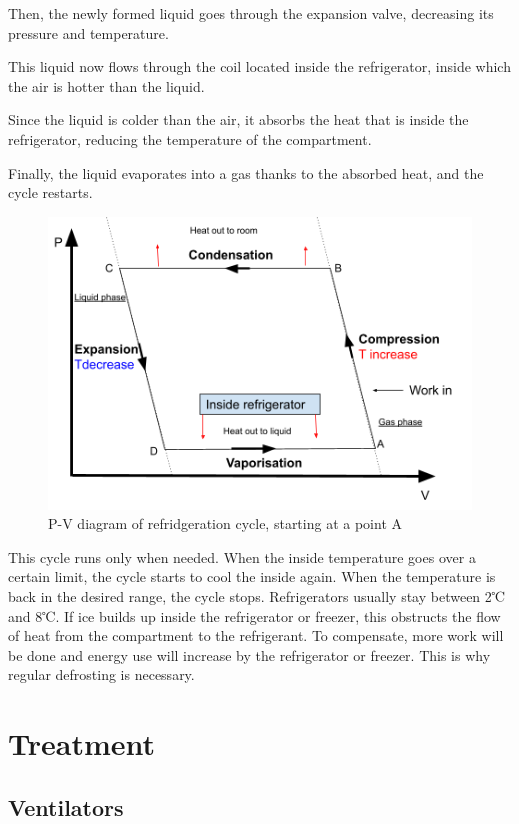 \documentclass[11pt]{report}
\begin{document}
Then, the newly formed liquid goes through the expansion valve, decreasing its pressure and temperature.

This liquid now flows through the coil located inside the refrigerator, inside which the air is hotter than the liquid.

Since the liquid is colder than the air, it absorbs the heat that is inside the refrigerator, reducing the temperature of the compartment. 

Finally, the liquid evaporates into a gas thanks to the absorbed heat, and the cycle restarts.

\begin{figure}[h!]
    \centering
    \includegraphics[width=1.1\textwidth,clip]{PV.refrigeration.cycle.png}
    \caption{P-V diagram of refridgeration cycle, starting at a point A}
    \label{Refridgeration Cycle}
\end{figure}

This cycle runs only when needed. When the inside temperature goes over a certain limit, the cycle starts to cool the inside again. When the temperature is back in the desired range, the cycle stops. Refrigerators usually stay between 2℃ and 8℃. If ice builds up inside the refrigerator or freezer, this obstructs the flow of heat from the compartment to the refrigerant. To compensate, more work will be done and energy use will increase by the refrigerator or freezer. This is why regular defrosting is necessary.


		\section{Treatment}
			\subsection{Ventilators}
			
\end{document}
